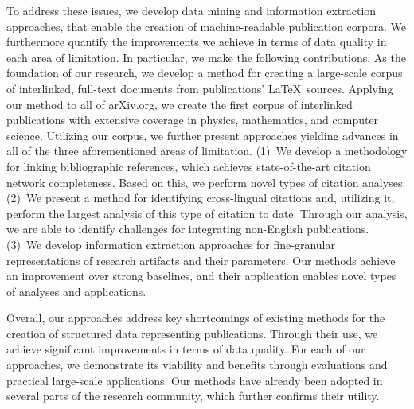 To address these issues, we develop %
data mining and information extraction approaches, that enable the creation of machine-readable publication corpora.
We furthermore quantify the improvements we achieve in terms of data quality in each area of limitation.
%
In particular, we make the following contributions.
As the foundation of our research, we develop a method for creating a large-scale corpus of interlinked, full-text documents from publications' \LaTeX\ sources.
Applying our method to all of arXiv.org, we create the first corpus of interlinked publications with extensive %
coverage in physics, mathematics, and computer science.  %
Utilizing our corpus, we further present approaches yielding advances in all of the three aforementioned areas of limitation.
(1)~We develop a methodology for linking bibliographic references, which achieves state-of-the-art citation network completeness. Based on this, we perform novel types of citation analyses.
(2)~We present a method for identifying cross-lingual citations and, utilizing it, perform the largest analysis of this type of citation to date. Through our analysis, we are able to identify challenges for integrating non-English publications.
(3)~We develop information extraction approaches for fine-granular representations of research artifacts and their parameters.
Our methods achieve an improvement over strong baselines, and their application enables novel types of analyses and applications.


Overall, our approaches address key shortcomings of existing methods for the creation of structured data representing publications.
Through their use, we achieve significant improvements in terms of data quality.
For each of our approaches, we demonstrate its viability and benefits through evaluations and practical large-scale applications.
Our methods have already been adopted in several parts of the research community, which further confirms their utility.
